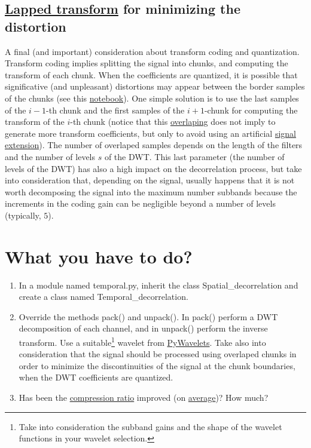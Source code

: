 \subsection{\href{https://en.wikipedia.org/wiki/Lapped_transform}{Lapped transform} for minimizing the distortion}
A final (and important) consideration about transform coding and
quantization. Transform coding implies splitting the signal into
chunks, and computing the transform of each chunk. When the
coefficients are quantized, it is possible that significative (and
unpleasant) distortions may appear between the border samples of the
chunks (see this
\href{https://github.com/Tecnologias-multimedia/intercom/blob/master/docs/quantization_DWT.ipynb}{notebook}). One
simple solution is to use the last samples of the $i-1$-th chunk and
the first samples of the $i+1$-chunk for computing the transform of
the $i$-th chunk (notice that this
\href{https://en.wikipedia.org/wiki/Lapped_transform}{overlaping} does
not imply to generate more transform coefficients, but only to avoid
using an artificial
\href{https://pywavelets.readthedocs.io/en/latest/ref/signal-extension-modes.html}{signal
  extension}). The number of overlaped samples depends on the length
of the filters and the number of levels $s$ of the DWT. This last
parameter (the number of levels of the DWT) has also a high impact on
the decorrelation process, but take into consideration that, depending
on the signal, usually happens that it is not worth decomposing the
signal into the maximum number subbands because the increments in the
coding gain can be negligible beyond a number of levels (typically,
$5$).
  
\section{What you have to do?}

\begin{enumerate}
\item In a module named temporal.py, inherit the class
  Spatial\_decorrelation and create a class named Temporal\_decorrelation.
\item Override the methods pack() and unpack(). In pack() perform a
  DWT decomposition of each channel, and in unpack() perform the
  inverse transform. Use a suitable\footnote{Take into consideration
    the subband gains and the shape of the wavelet functions in your
    wavelet selection.} wavelet from
  \href{https://pywavelets.readthedocs.io/en/latest/}{PyWavelets}. Take
  also into consideration that the signal should be processed using
  overlaped chunks in order to minimize the discontinuities of the
  signal at the chunk boundaries, when the DWT coefficients are
  quantized.
\item Has been the
  \href{https://en.wikipedia.org/wiki/Data_compression_ratio}{compression
    ratio} improved (on
  \href{https://en.wikipedia.org/wiki/Average}{average})? How much?
\end{enumerate}

